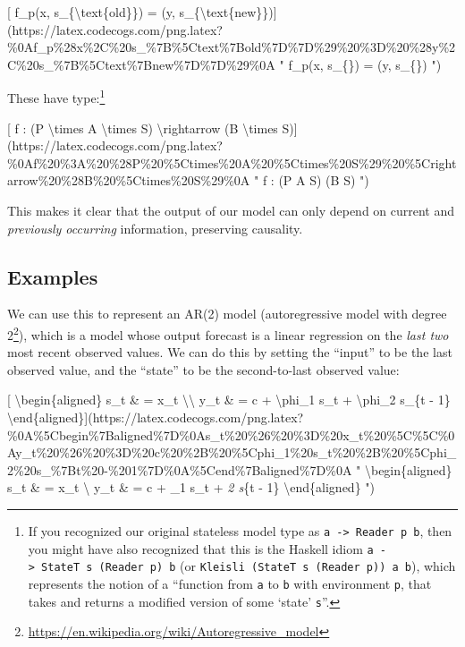 \documentclass[]{article}
\renewcommand{\href}[2]{#2\footnote{\url{#1}}}
\begin{document}
{[} f\_p(x, s\_\{\textbackslash{}text\{old\}\}) = (y,
s\_\{\textbackslash{}text\{new\}\}){]}(https://latex.codecogs.com/png.latex?\%0Af\_p\%28x\%2C\%20s\_\%7B\%5Ctext\%7Bold\%7D\%7D\%29\%20\%3D\%20\%28y\%2C\%20s\_\%7B\%5Ctext\%7Bnew\%7D\%7D\%29\%0A
" f\_p(x, s\_\{\}) = (y, s\_\{\}) ")

These have type:\footnote{If you recognized our original stateless model type as
  \texttt{a\ -\textgreater{}\ Reader\ p\ b}, then you might have also recognized
  that this is the Haskell idiom
  \texttt{a\ -\textgreater{}\ StateT\ s\ (Reader\ p)\ b} (or
  \texttt{Kleisli\ (StateT\ s\ (Reader\ p))\ a\ b}), which represents the notion
  of a ``function from \texttt{a} to \texttt{b} with environment \texttt{p},
  that takes and returns a modified version of some `state' \texttt{s}''.}

{[} f : (P \textbackslash{}times A \textbackslash{}times S)
\textbackslash{}rightarrow (B \textbackslash{}times
S){]}(https://latex.codecogs.com/png.latex?\%0Af\%20\%3A\%20\%28P\%20\%5Ctimes\%20A\%20\%5Ctimes\%20S\%29\%20\%5Crightarrow\%20\%28B\%20\%5Ctimes\%20S\%29\%0A
" f : (P \times A \times S) \rightarrow (B \times S) ")

This makes it clear that the output of our model can only depend on current and
\emph{previously occurring} information, preserving causality.

\hypertarget{examples}{%
\subsection{Examples}\label{examples}}

We can use this to represent an AR(2) model
(\href{https://en.wikipedia.org/wiki/Autoregressive_model}{autoregressive model
with degree 2}), which is a model whose output forecast is a linear regression
on the \emph{last two} most recent observed values. We can do this by setting
the ``input'' to be the last observed value, and the ``state'' to be the
second-to-last observed value:

{[} \textbackslash{}begin\{aligned\} s\_t \& = x\_t
\textbackslash{}\textbackslash{} y\_t \& = c + \textbackslash{}phi\_1 s\_t +
\textbackslash{}phi\_2 s\_\{t - 1\}
\textbackslash{}end\{aligned\}{]}(https://latex.codecogs.com/png.latex?\%0A\%5Cbegin\%7Baligned\%7D\%0As\_t\%20\%26\%20\%3D\%20x\_t\%20\%5C\%5C\%0Ay\_t\%20\%26\%20\%3D\%20c\%20\%2B\%20\%5Cphi\_1\%20s\_t\%20\%2B\%20\%5Cphi\_2\%20s\_\%7Bt\%20-\%201\%7D\%0A\%5Cend\%7Baligned\%7D\%0A
" \textbackslash{}begin\{aligned\} s\_t \& = x\_t \textbackslash{} y\_t \& = c +
\phi\_1 s\_t + \phi\emph{2 s}\{t - 1\} \textbackslash{}end\{aligned\} ")
\end{document}
